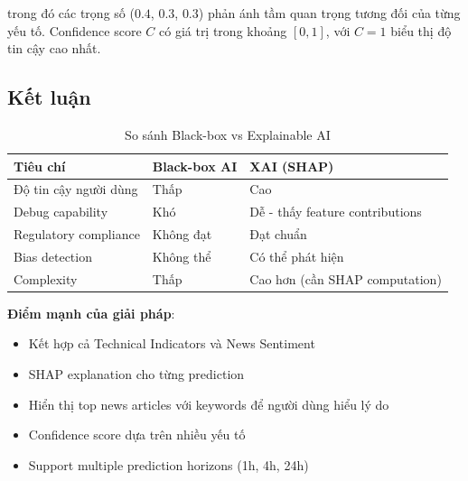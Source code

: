 trong đó các trọng số ($0.4$, $0.3$, $0.3$) phản ánh tầm quan trọng tương đối của từng yếu tố. Confidence score $C$ có giá trị trong khoảng $[0, 1]$, với $C = 1$ biểu thị độ tin cậy cao nhất.

\subsection{Kết luận}

\begin{table}[H]
\centering
\caption{So sánh Black-box vs Explainable AI}
\begin{tabular}{|p{4cm}|p{5cm}|p{5cm}|}
\hline
\textbf{Tiêu chí} & \textbf{Black-box AI} & \textbf{XAI (SHAP)} \\
\hline
Độ tin cậy người dùng & Thấp & Cao \\
\hline
Debug capability & Khó & Dễ - thấy feature contributions \\
\hline
Regulatory compliance & Không đạt & Đạt chuẩn \\
\hline
Bias detection & Không thể & Có thể phát hiện \\
\hline
Complexity & Thấp & Cao hơn (cần SHAP computation) \\
\hline
\end{tabular}
\end{table}

\textbf{Điểm mạnh của giải pháp}:
\begin{itemize}
    \item Kết hợp cả Technical Indicators và News Sentiment
    \item SHAP explanation cho từng prediction
    \item Hiển thị top news articles với keywords để người dùng hiểu lý do
    \item Confidence score dựa trên nhiều yếu tố
    \item Support multiple prediction horizons (1h, 4h, 24h)
\end{itemize}
